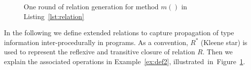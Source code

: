 \documentclass{fac}
\begin{document}
\begin{figure}
\caption{One round of relation generation for method $m()$ in Listing~\ref{lst:relation}}
\label{fig:relations}
\end{figure}


In the following we define extended relations to capture propagation of type information inter-procedurally in programs. As a convention, $R^*$ (Kleene star) is used to represent the reflexive and transitive closure of relation $R$. Then we explain the associated operations in Example~\ref{ex:def2}, illustrated~in~Figure~\ref{fig:relations}.
\end{document}
